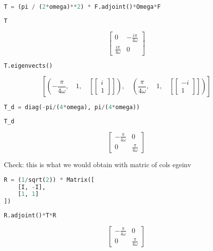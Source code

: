 \begin{lstlisting}[language=Python]
T = (pi / (2*omega)**2) * F.adjoint()*Omega*F
\end{lstlisting}

\begin{lstlisting}[language=Python]
T
\end{lstlisting}

\[\left[\begin{matrix}0 & - \frac{i \pi}{4 \omega}\\\frac{i \pi}{4 \omega} & 0\end{matrix}\right]\]

\begin{lstlisting}[language=Python]
T.eigenvects()
\end{lstlisting}

\[\left [ \left ( - \frac{\pi}{4 \omega}, \quad 1, \quad \left [ \left[\begin{matrix}i\\1\end{matrix}\right]\right ]\right ), \quad \left ( \frac{\pi}{4 \omega}, \quad 1, \quad \left [ \left[\begin{matrix}- i\\1\end{matrix}\right]\right ]\right )\right ]\]

\begin{lstlisting}[language=Python]
T_d = diag(-pi/(4*omega), pi/(4*omega))
\end{lstlisting}

\begin{lstlisting}[language=Python]
T_d
\end{lstlisting}

\[\left[\begin{matrix}- \frac{\pi}{4 \omega} & 0\\0 & \frac{\pi}{4 \omega}\end{matrix}\right]\]

Check: this is what we would obtain with matric of cols egeinv

\begin{lstlisting}[language=Python]
R = (1/sqrt(2)) * Matrix([
    [I, -I],
    [1, 1]
])
\end{lstlisting}

\begin{lstlisting}[language=Python]
R.adjoint()*T*R
\end{lstlisting}

\[\left[\begin{matrix}- \frac{\pi}{4 \omega} & 0\\0 & \frac{\pi}{4 \omega}\end{matrix}\right]\]

